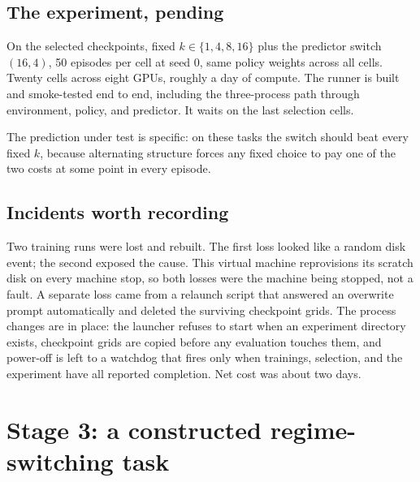 \documentclass[11pt]{article}
\begin{document}
\subsection{The experiment, pending}

On the selected checkpoints, fixed $k \in \{1, 4, 8, 16\}$ plus the predictor
switch $(16,4)$, 50 episodes per cell at seed 0, same policy weights across
all cells. Twenty cells across eight GPUs, roughly a day of compute. The
runner is built and smoke-tested end to end, including the three-process path
through environment, policy, and predictor. It waits on the last selection
cells.

The prediction under test is specific: on these tasks the switch should beat
every fixed $k$, because alternating structure forces any fixed choice to pay
one of the two costs at some point in every episode.

\subsection{Incidents worth recording}

Two training runs were lost and rebuilt. The first loss looked like a random
disk event; the second exposed the cause. This virtual machine reprovisions
its scratch disk on every machine stop, so both losses were the machine being
stopped, not a fault. A separate loss came from a relaunch script that
answered an overwrite prompt automatically and deleted the surviving
checkpoint grids. The process changes are in place: the launcher refuses to
start when an experiment directory exists, checkpoint grids are copied before
any evaluation touches them, and power-off is left to a watchdog that fires
only when trainings, selection, and the experiment have all reported
completion. Net cost was about two days.

\section{Stage 3: a constructed regime-switching task}
\end{document}
